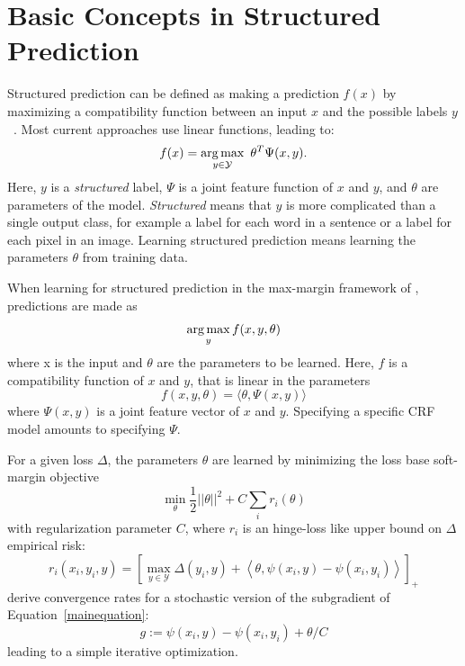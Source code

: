 
\section{Basic Concepts in Structured Prediction}

Structured prediction can be defined as making a prediction $f(x)$ by maximizing a
compati\-bility function between an input $x$ and the possible labels
$y$~\citep{nowozin2011structured}. Most current approaches use linear functions,
leading to:
\begin{equation}\label{eq:main_equation}
    f(x) = \operatorname*{arg\,max}_{y \in \mathcal{Y}}\  \theta^T \Psi(x, y).
\end{equation}
Here, $y$ is a \emph{structured} label, $\Psi$ is a joint feature function of $x$ and $y$, and
$\theta$ are parameters of the model. \emph{Structured} means that $y$ is more complicated than a single
output class, for example a label for each word in a sentence or a label for
each pixel in an image.
Learning structured prediction means learning the parameters $\theta$ from training data.

When learning for structured prediction in the max-margin framework of
\cite{tsochantaridis2006large}, predictions are made as
\[ \operatorname*{arg\,max}_y f(x, y, \theta)\]
where x is the input and $\theta$ are the parameters to be learned.
Here, $f$ is a compatibility function of $x$ and $y$, that is linear in the parameters
\[f(x, y, \theta) = \langle \theta, \Psi(x, y) \rangle\]
where $\Psi(x, y)$ is a joint feature vector of $x$ and $y$. Specifying a specific CRF model
amounts to specifying $\Psi$.

For a given loss $\Delta$, the parameters $\theta$ are learned by minimizing
the loss base soft-margin objective
\begin{equation}\label{mainequation}
    \min_\theta \frac{1}{2} ||\theta||^2 + C \sum_i  r_i(\theta)
\end{equation}
with regularization parameter $C$, where $r_i$ is an hinge-loss like upper
bound on $\Delta$ empirical risk:
\[r_i(x_i, y_i, y) = [\max_{y \in \mathcal{Y}} \Delta(y_i, y) + \left<\theta, \psi(x_i, y) - \psi(x_i, y_i) \right >]_+ \]
\citep{ratliff2007online} derive convergence rates for a stochastic version of the subgradient of  Equation~\ref{mainequation}:
\begin{equation}\label{subgradient}
    g := \psi(x_i, y) - \psi(x_i, y_i) + \theta / C
\end{equation}
leading to a simple iterative optimization.

